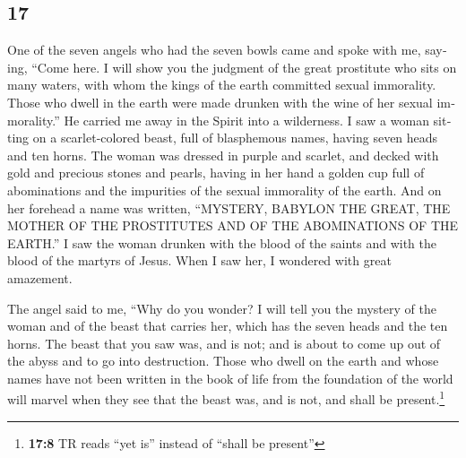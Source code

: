 \begin{paracol}{2}
\begin{otherlanguage}{english}
\hypertarget{section-33}{%
\section{17}\label{section-33}}

 One of the seven angels who had the seven bowls came and
spoke with me, saying, ``Come here. I will show you the judgment of the
great prostitute who sits on many waters,  with whom the
kings of the earth committed sexual immorality. Those who dwell in the
earth were made drunken with the wine of her sexual immorality.''
 He carried me away in the Spirit into a wilderness. I saw
a woman sitting on a scarlet-colored beast, full of blasphemous names,
having seven heads and ten horns.  The woman was dressed
in purple and scarlet, and decked with gold and precious stones and
pearls, having in her hand a golden cup full of abominations and the
impurities of the sexual immorality of the earth.  And on
her forehead a name was written, ``MYSTERY, BABYLON THE GREAT, THE
MOTHER OF THE PROSTITUTES AND OF THE ABOMINATIONS OF THE EARTH.''
 I saw the woman drunken with the blood of the saints and
with the blood of the martyrs of Jesus. When I saw her, I wondered with
great amazement.

 The angel said to me, ``Why do you wonder? I will tell
you the mystery of the woman and of the beast that carries her, which
has the seven heads and the ten horns.  The beast that you
saw was, and is not; and is about to come up out of the abyss and to go
into destruction. Those who dwell on the earth and whose names have not
been written in the book of life from the foundation of the world will
marvel when they see that the beast was, and is not, and shall be
present.\footnote{\textbf{17:8} TR reads ``yet is'' instead of ``shall
  be present''}


\end{otherlanguage}
\end{paracol}
